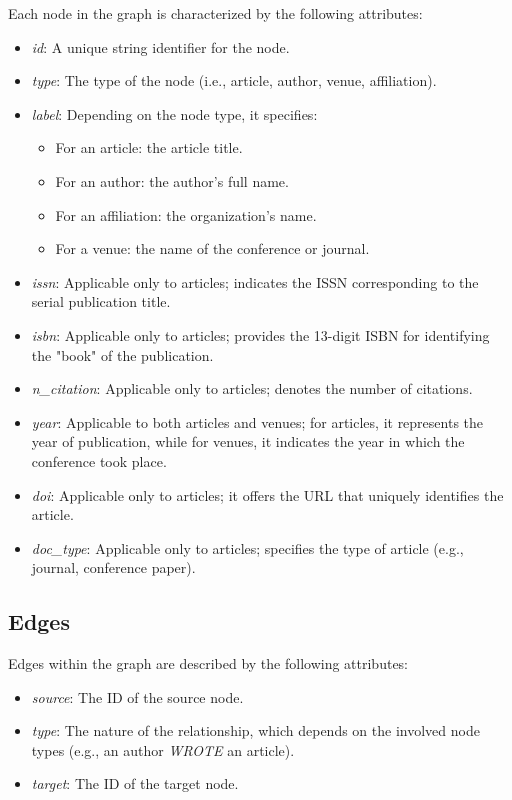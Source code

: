 Each node in the graph is characterized by the following attributes:
\begin{itemize}
    \item \emph{id}: A unique string identifier for the node.
    \item \emph{type}: The type of the node (i.e., article, author, venue, affiliation).
    \item \emph{label}: Depending on the node type, it specifies:
    \begin{itemize}
        \item For an article: the article title.
        \item For an author: the author’s full name.
        \item For an affiliation: the organization’s name.
        \item For a venue: the name of the conference or journal.
    \end{itemize}
    \item \emph{issn}: Applicable only to articles; indicates the ISSN corresponding to the serial publication title.
    \item \emph{isbn}: Applicable only to articles; provides the 13-digit ISBN for identifying the "book" of the publication.
    \item \emph{n\_citation}: Applicable only to articles; denotes the number of citations.
    \item \emph{year}: Applicable to both articles and venues; for articles, it represents the year of publication, while for venues, it indicates the year in which the conference took place.
    \item \emph{doi}: Applicable only to articles; it offers the URL that uniquely identifies the article.
    \item \emph{doc\_type}: Applicable only to articles; specifies the type of article (e.g., journal, conference paper).
\end{itemize}

\subsection*{Edges}

Edges within the graph are described by the following attributes:
\begin{itemize}
    \item \emph{source}: The ID of the source node.
    \item \emph{type}: The nature of the relationship, which depends on the involved node types (e.g., an author \textit{WROTE} an article).
    \item \emph{target}: The ID of the target node.
\end{itemize}